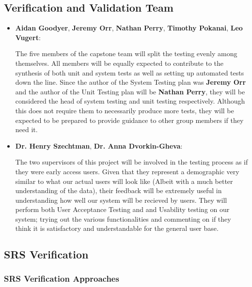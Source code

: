 \documentclass[12pt, titlepage]{article}
\begin{document}
\subsection{Verification and Validation Team}

\begin{itemize}
  \item{\textbf{Aidan Goodyer}, \textbf{Jeremy Orr}, \textbf{Nathan Perry}, \textbf{Timothy Pokanai}, \textbf{Leo Vugert}:}
   \par{The five members of the capstone team will split the testing evenly among themselves. All members will be equally expected to
  contribute to the synthesis of both unit and system tests as well as setting up automated tests down the line. Since the author of the System Testing plan was \textbf{Jeremy Orr}
  and the author of the Unit Testing plan will be \textbf{Nathan Perry}, they will be considered the head of system testing and unit testing respectively. Although
  this does not require them to necessarily produce more tests, they will be expected to be prepared to provide guidance to other group members if they need it.}
  \item{\textbf{Dr. Henry Szechtman}, \textbf{Dr. Anna Dvorkin-Gheva}:} 
  \par{ The two supervisors of this project will be involved in the testing process as if they were early
  access users. Given that they represent a demographic very similar to what our actual users will look like (Albeit with a much better understanding of the data),
  their feedback will be extremely useful in understanding how well our system will be recieved by users. They will perform both User Acceptance Testing and
  and Usability testing on our system; trying out the various functionalities and commenting on if they think it is satisfactory and understandable for the
  general user base.}

\end{itemize}

\subsection{SRS Verification}

\subsubsection{SRS Verification Approaches}
\end{document}
